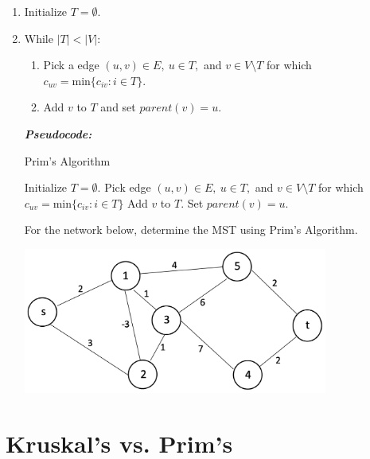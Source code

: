 \documentclass[12pt]{article}
\theoremstyle{definition}
\begin{document}
\begin{enumerate}

	\item Initialize $T = \emptyset$.
	\item While $|T| < |V|$:
	\begin{enumerate}
		\item Pick a edge $(u,v) \in E, \ u \in T,$ and $ v \in V \setminus T$ for which $c_{uv} = \textrm{min}\{c_{iv}: i \in T\}$.
		\item Add $v$ to $T$ and set $parent(v) = u$.
	\end{enumerate}

\emph{\textbf{Pseudocode:}}


\begin{algorithm}
\caption{Prim's Algorithm}
\begin{algorithmic} 
\STATE Initialize $T = \emptyset$.
	\STATE Pick edge $(u,v) \in E, \ u \in T,$ and $ v \in V \setminus T$ for which $c_{uv} = \textrm{min}\{c_{iv}: i \in T\}$
	\STATE Add $v$ to $T$.
	\STATE Set $parent(v) = u$.
\ENDWHILE
\end{algorithmic}
\end{algorithm}


For the network below, determine the MST using Prim's Algorithm.

\begin{center}
\includegraphics[width=10cm]{minspanningtree}
\end{center}


\newpage

\end{enumerate}


\section{Kruskal's vs. Prim's}
\end{document}
